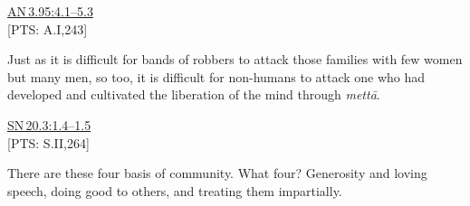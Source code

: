 \documentclass[10pt, openright]{book}
\begin{document}
\begin{flushright}
\href{https://suttacentral.net/an3.95/en/sujato\#4.1}{AN 3.95:4.1–5.3}\\

[PTS: A.I,243]


\end{flushright}
Just as it is difficult for bands of robbers to attack those families with few women but many men, so too, it is difficult for non-humans to attack one who had developed and cultivated the liberation of the mind through \textit{mettā}.


\begin{flushright}
\href{https://suttacentral.net/sn20.3/en/sujato\#1.4}{SN 20.3:1.4–1.5}\\

[PTS: S.II,264]


\end{flushright}
There are these four basis of community. What four? Generosity and loving speech, doing good to others, and treating them impartially.
\end{document}
